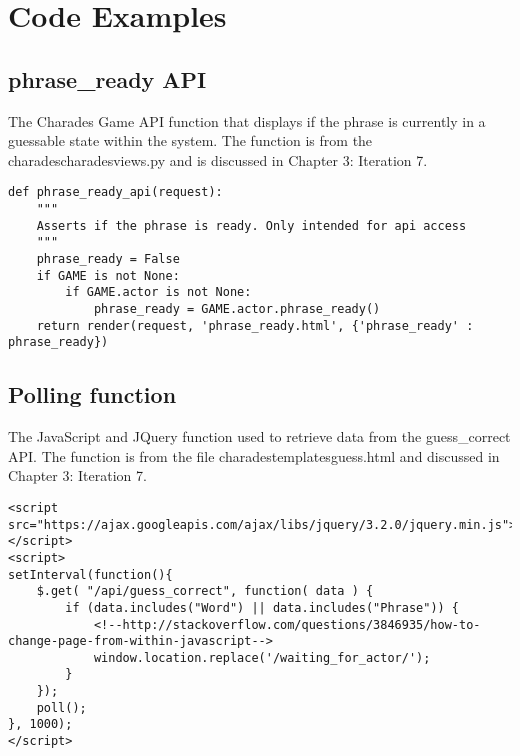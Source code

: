 \chapter{Code Examples}

\section{phrase\_ready API}

The Charades Game API function that displays if the phrase is currently in a guessable state within the system. The function is from the charades\/charades\/views.py and is discussed in Chapter 3: Iteration 7.

\begin{verbatim}
def phrase_ready_api(request):
    """
    Asserts if the phrase is ready. Only intended for api access
    """
    phrase_ready = False
    if GAME is not None:
        if GAME.actor is not None:
            phrase_ready = GAME.actor.phrase_ready()
    return render(request, 'phrase_ready.html', {'phrase_ready' : phrase_ready})
\end{verbatim}


\section{Polling function}

The JavaScript and JQuery function used to retrieve data from the guess\_correct API. The function is from the file charades\/templates\/guess.html and discussed in Chapter 3: Iteration 7.

\begin{verbatim}
<script src="https://ajax.googleapis.com/ajax/libs/jquery/3.2.0/jquery.min.js"></script>
<script>
setInterval(function(){
    $.get( "/api/guess_correct", function( data ) {
        if (data.includes("Word") || data.includes("Phrase")) {
            <!--http://stackoverflow.com/questions/3846935/how-to-change-page-from-within-javascript-->
            window.location.replace('/waiting_for_actor/');
        }
    });
    poll();
}, 1000);
</script>
\end{verbatim}